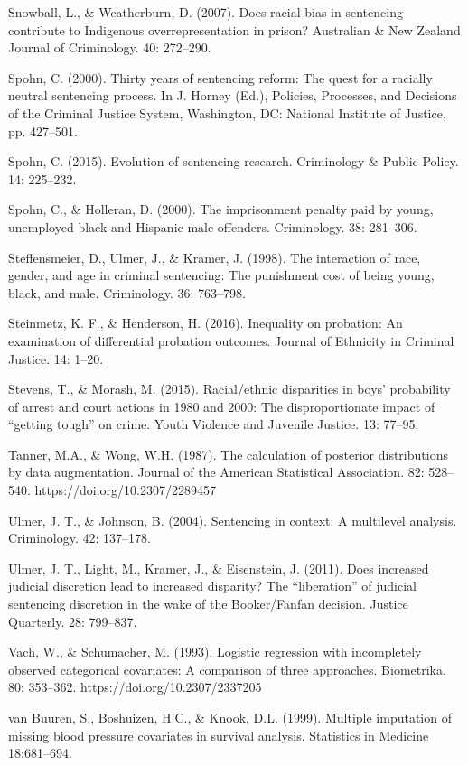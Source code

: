 \documentclass[titlepage]{article}
\begin{document}
Snowball, L., \& Weatherburn, D. (2007). Does racial bias in sentencing contribute to Indigenous overrepresentation in prison? Australian \& New Zealand Journal of Criminology. 40: 272--290.

Spohn, C. (2000). Thirty years of sentencing reform: The quest for a racially neutral sentencing process. In J. Horney (Ed.), Policies, Processes, and Decisions of the Criminal Justice System, Washington, DC: National Institute of Justice, pp. 427--501.

Spohn, C. (2015). Evolution of sentencing research. Criminology \& Public Policy. 14: 225--232.

Spohn, C., \& Holleran, D. (2000). The imprisonment penalty paid by young, unemployed black and Hispanic male offenders. Criminology. 38: 281--306.

Steffensmeier, D., Ulmer, J., \& Kramer, J. (1998). The interaction of race, gender, and age in criminal sentencing: The punishment cost of being young, black, and male. Criminology. 36: 763--798.

Steinmetz, K. F., \& Henderson, H. (2016). Inequality on probation: An examination of differential probation outcomes. Journal of Ethnicity in Criminal Justice. 14: 1--20.

Stevens, T., \& Morash, M. (2015). Racial/ethnic disparities in boys’ probability of arrest and court actions in 1980 and 2000: The disproportionate impact of “getting tough” on crime. Youth Violence and Juvenile Justice. 13: 77--95.

Tanner, M.A., \& Wong, W.H. (1987). The calculation of posterior distributions by data augmentation. Journal of the American Statistical Association. 82: 528--540. https://doi.org/10.2307/2289457

Ulmer, J. T., \& Johnson, B. (2004). Sentencing in context: A multilevel analysis. Criminology. 42: 137--178.

Ulmer, J. T., Light, M., Kramer, J., \& Eisenstein, J. (2011). Does increased judicial discretion lead to increased disparity? The “liberation” of judicial sentencing discretion in the wake of the Booker/Fanfan decision. Justice Quarterly. 28: 799--837.

Vach, W., \& Schumacher, M. (1993). Logistic regression with incompletely observed categorical covariates: A comparison of three approaches. Biometrika. 80: 353--362. https://doi.org/10.2307/2337205 

van Buuren, S., Boshuizen, H.C., \& Knook, D.L. (1999). Multiple imputation of missing blood pressure covariates in survival analysis. Statistics in Medicine 18:681–694.
\end{document}
